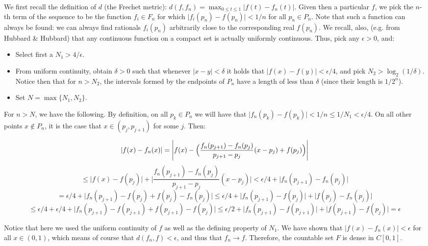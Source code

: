\begin{solution}
    We first recall the definition of $d$ (the Frechet metric): $d(f, f_n) = \max_{0 \leq t \leq 1} \lvert f(t) - f_n(t) \rvert$. 
    Given then a particular $f$, we pick the $n$-th term of the sequence to be the function $f_i \in F_n$ for which $\lvert f_i(p_n) - f(p_n) \rvert < 1/n$ for all $p_n \in P_n$.
    Note that such a function can always be found: we can always find rationals $f_i(p_n)$ arbitrarily close to the corresponding real $f(p_n)$.
    We recall, also, (e.g. from Hubbard \& Hubbard) that any continuous function on a compact set is actually uniformly continuous.
    Thus, pick any $\epsilon > 0$, and:
    \begin{itemize}
        \item Select first a $N_1 > 4/\epsilon$.
        \item From uniform continuity, obtain $\delta > 0$ such that whenever $\lvert x - y \rvert < \delta$ it holds that $\lvert f(x) - f(y) \rvert < \epsilon/4$, and pick $N_2 > \log_2(1/\delta)$.
        Notice then that for $n > N_2$, the intervals formed by the endpoints of $P_n$ have a length of less than $\delta$ (since their length is $1/2^n$).
        \item Set $N = \max\{N_1, N_2\}$.
    \end{itemize}
    For $n > N$, we have the following.
    By definition, on all $p_k \in P_n$ we will have that $\lvert f_n(p_k) - f(p_k) \rvert < 1/n \leq 1/N_1 < \epsilon/4$.
    On all other points $x \notin P_n$, it is the case that $x \in (p_j, p_{j+1})$ for some $j$.
    Then:

    $$\lvert f(x) - f_n(x) \rvert = \Biggl\lvert f(x) - \Bigl(\frac{f_n(p_{j+1}) - f_n(p_j)}{p_{j+1} - p_j}(x - p_j) + f(p_j)\Bigr) \Biggr\rvert$$
    $$ \leq \lvert f(x) - f(p_j) \rvert + \Biggl\lvert \frac{f_n(p_{j+1}) - f_n(p_j)}{p_{j+1} - p_j}(x - p_j)\Biggr\rvert < \epsilon/4 + \lvert f_n(p_{j+1}) - f_n(p_j) \rvert$$
    $$ = \epsilon/4 + \lvert f_n(p_{j+1}) - f(p_j) + f(p_j) - f_n(p_j) \rvert \leq \epsilon/4 + \lvert f_n(p_{j+1}) - f(p_j) \rvert + \lvert f(p_j) - f_n(p_j) \rvert$$
    $$\leq \epsilon/4 + \epsilon/4 + \lvert f_n(p_{j+1}) - f(p_{j+1}) + f(p_{j+1}) - f(p_j) \rvert \leq \epsilon/2 + \lvert f_n(p_{j+1}) - f(p_{j+1}) \rvert + \lvert f(p_{j+1}) - f(p_j) \rvert = \epsilon$$

    Notice that here we used the uniform continuity of $f$ as well as the defining property of $N_1$.
    We have shown that $\lvert f(x) - f_n(x) \rvert < \epsilon$ for all $x \in (0, 1)$, which means of course that $d(f_n, f) < \epsilon$, and thus that $f_n \rightarrow f$.
    Therefore, the countable set $F$ is dense in $C[0, 1]$.
\end{solution}

